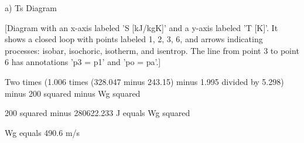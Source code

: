 a) Ts Diagram

[Diagram with an x-axis labeled 'S [kJ/kgK]' and a y-axis labeled 'T [K]'. It shows a closed loop with points labeled 1, 2, 3, 6, and arrows indicating processes: isobar, isochoric, isotherm, and isentrop. The line from point 3 to point 6 has annotations 'p3 = p1' and 'po = pa'.]

Two times (1.006 times (328.047 minus 243.15) minus 1.995 divided by 5.298) minus 200 squared minus Wg squared

200 squared minus 280622.233 J equals Wg squared

Wg equals 490.6 m/s
